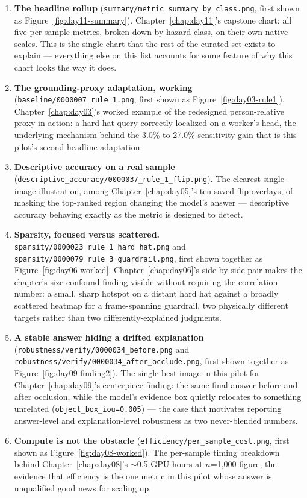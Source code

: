 \begin{enumerate}
\item \textbf{The headline rollup} (\texttt{summary/metric\_summary\_by\_class.png}, first
shown as Figure~\ref{fig:day11-summary}). Chapter~\ref{chap:day11}'s capstone chart: all five
per-sample metrics, broken down by hazard class, on their own native scales. This is the single
chart that the rest of the curated set exists to explain --- everything else on this list
accounts for some feature of why this chart looks the way it does.

\item \textbf{The grounding-proxy adaptation, working} (\texttt{baseline/0000007\_rule\_1.png},
first shown as Figure~\ref{fig:day03-rule1}). Chapter~\ref{chap:day03}'s worked example of the
redesigned person-relative proxy in action: a hard-hat query correctly localized on a worker's
head, the underlying mechanism behind the 3.0\%-to-27.0\% sensitivity gain that is this pilot's
second headline adaptation.

\item \textbf{Descriptive accuracy on a real sample}
(\texttt{descriptive\_accuracy/0000037\_rule\_1\_flip.png}). The clearest single-image
illustration, among Chapter~\ref{chap:day05}'s ten saved flip overlays, of masking the top-ranked
region changing the model's answer --- descriptive accuracy behaving exactly as the metric is
designed to detect.

\item \textbf{Sparsity, focused versus scattered.}
\texttt{sparsity/0000023\_rule\_1\_hard\_hat.png} and
\texttt{sparsity/0000079\_rule\_3\_guardrail.png}, first shown together as
Figure~\ref{fig:day06-worked}. Chapter~\ref{chap:day06}'s side-by-side pair makes the
chapter's size-confound finding visible without requiring the correlation number: a small,
sharp hotspot on a distant hard hat against a broadly scattered heatmap for a frame-spanning
guardrail, two physically different targets rather than two differently-explained judgments.

\item \textbf{A stable answer hiding a drifted explanation}
(\texttt{robustness/verify/0000034\_before.png} and
\texttt{robustness/verify/0000034\_after\_occlude.png}, first shown together as
Figure~\ref{fig:day09-finding2}). The single best image in this pilot for
Chapter~\ref{chap:day09}'s centerpiece finding: the same final answer before and after
occlusion, while the model's evidence box quietly relocates to something unrelated
(\texttt{object\_box\_iou=0.005}) --- the case that motivates reporting answer-level and
explanation-level robustness as two never-blended numbers.

\item \textbf{Compute is not the obstacle} (\texttt{efficiency/per\_sample\_cost.png}, first
shown as Figure~\ref{fig:day08-worked}). The per-sample timing breakdown behind
Chapter~\ref{chap:day08}'s $\sim$0.5-GPU-hours-at-$n$=1,000 figure, the evidence that efficiency
is the one metric in this pilot whose answer is unqualified good news for scaling up.
\end{enumerate}

